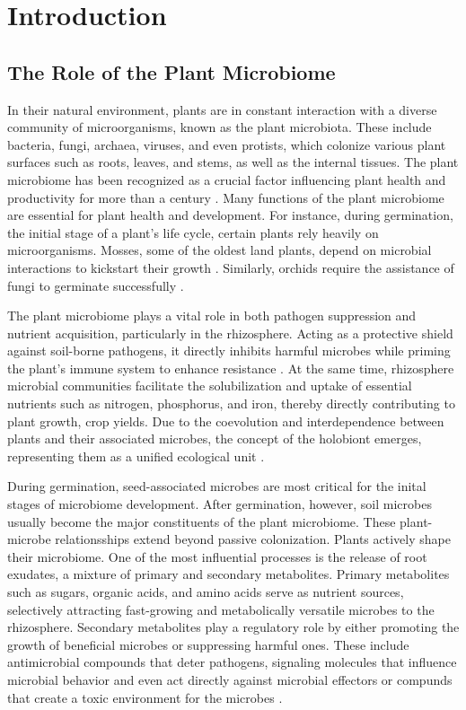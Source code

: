 \section{Introduction}

\subsection{The Role of the Plant Microbiome}
In their natural environment, plants are in constant interaction with a diverse community of microorganisms, known as the plant microbiota. These include bacteria, fungi, archaea, viruses, and even protists, which colonize various plant surfaces such as roots, leaves, and stems, as well as the internal tissues.
The plant microbiome has been recognized as a crucial factor influencing plant health and productivity for more than a century \cite{berg2016Plant}.
Many functions of the plant microbiome are essential for plant health and development. For instance, during germination, the initial stage of a plant's life cycle, certain plants rely heavily on microorganisms. Mosses, some of the oldest land plants, depend on microbial interactions to kickstart their growth \cite{hornschuh2006Mossassociated}. 
Similarly, orchids require the assistance of fungi to germinate successfully \cite{jacquemyn2015Mycorrhizal}. 

The plant microbiome plays a vital role in both pathogen suppression and nutrient acquisition, particularly in the rhizosphere. Acting as a protective shield against soil-borne pathogens, it directly inhibits harmful microbes while priming the plant's immune system to enhance resistance \cite{berg2016Plant}. At the same time, rhizosphere microbial communities facilitate the solubilization and uptake of essential nutrients such as nitrogen, phosphorus, and iron, thereby directly contributing to plant growth, crop yields. Due to the coevolution and interdependence between plants and their associated microbes, the concept of the holobiont emerges, representing them as a unified ecological unit \cite{spooren2024PlantDriven}.

During germination, seed-associated microbes are most critical for the inital stages of microbiome development. After germination, however, soil microbes usually become the major constituents of the plant microbiome. 
These plant-microbe relationsships extend beyond passive colonization. Plants actively shape their microbiome. 
One of the most influential processes is the release of root exudates, a mixture of primary and secondary metabolites. Primary metabolites such as sugars, organic acids, and amino acids serve as nutrient sources, selectively attracting fast-growing and metabolically versatile microbes to the rhizosphere.
Secondary metabolites play a regulatory role by either promoting the growth of beneficial microbes or suppressing harmful ones. These include antimicrobial compounds that deter pathogens, signaling molecules that influence microbial behavior and even act directly against microbial effectors or compunds that create a toxic environment for the microbes
\cite{spooren2024PlantDriven}.

